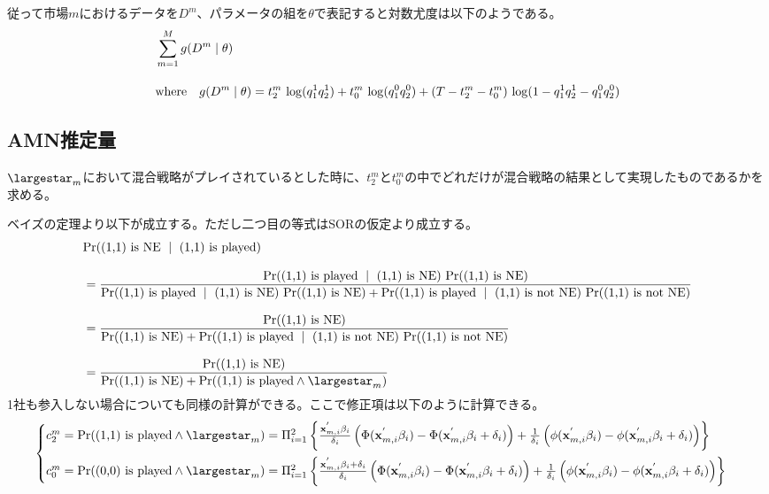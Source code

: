 \documentclass{jsarticle}
\begin{document}
従って市場$m$におけるデータを$D^m$、パラメータの組を$\theta$で表記すると対数尤度は以下のようである。
\begin{align*}
	&\sum_{m = 1}^M g(D^m \mid \theta)\\[10pt]
	&\text{where}\quad g(D^m \mid \theta) = t_2^m\ {\rm log} (q_1^1 q_2^1) + t_0^m\ {\rm log} (q_1^0 q_2^0) + (T - t_2^m - t_0^m)\ {\rm log} (1- q_1^1 q_2^1 - q_1^0 q_2^0)
\end{align*}


\subsection{AMN推定量}
$\largestar_m$において混合戦略がプレイされているとした時に、$t_2^m$と$t_0^m$の中でどれだけが混合戦略の結果として実現したものであるかを求める。

ベイズの定理より以下が成立する。ただし二つ目の等式はSORの仮定より成立する。
\begin{align*}
	&{\rm Pr}(\text{(1,1) is NE}\ \mid\ \text{(1,1) is played}) \\[8pt]
	&= \frac{{\rm Pr}(\text{(1,1) is played}\ \mid\ \text{(1,1) is NE})\ {\rm Pr}(\text{(1,1) is NE})}{{\rm Pr}(\text{(1,1) is played}\ \mid\ \text{(1,1) is NE})\ {\rm Pr}(\text{(1,1) is NE}) + {\rm Pr}(\text{(1,1) is played}\ \mid\ \text{(1,1) is not NE})\ {\rm Pr}(\text{(1,1) is not NE})}\\[8pt]
	&= \frac{{\rm Pr}(\text{(1,1) is NE})}{{\rm Pr}(\text{(1,1) is NE}) + {\rm Pr}(\text{(1,1) is played}\ \mid\ \text{(1,1) is not NE})\ {\rm Pr}(\text{(1,1) is not NE})}\\[8pt]
	&= \frac{{\rm Pr}(\text{(1,1) is NE})}{{\rm Pr}(\text{(1,1) is NE}) + {\rm Pr}(\text{(1,1) is played} \wedge \largestar_m)}
\end{align*}
1社も参入しない場合についても同様の計算ができる。ここで修正項は以下のように計算できる。
\begin{align*}
\begin{cases}
	c_2^m = {\rm Pr}(\text{(1,1) is played} \wedge \largestar_m) = \Pi_{i = 1}^2 \left\{ \frac{{\bf x}_{m, i}^{'} \beta_i }{\delta_i} \left( \Phi({\bf x}_{m, i}^{'} \beta_i) - \Phi({\bf x}_{m, i}^{'} \beta_i  + \delta_i) \right) + \frac{1}{\delta_i} \left( \phi({\bf x}_{m, i}^{'} \beta_i ) - \phi({\bf x}_{m, i}^{'} \beta_i  + \delta_i) \right) \right\}\\[10pt]
	c_0^m = {\rm Pr}(\text{(0,0) is played} \wedge \largestar_m) = \Pi_{i = 1}^2 \left\{ \frac{{\bf x}_{m, i}^{'} \beta_i +\delta_i}{\delta_i} \left( \Phi({\bf x}_{m, i}^{'} \beta_i) - \Phi({\bf x}_{m, i}^{'} \beta_i  + \delta_i) \right) + \frac{1}{\delta_i} \left( \phi({\bf x}_{m, i}^{'} \beta_i ) - \phi({\bf x}_{m, i}^{'} \beta_i  + \delta_i) \right) \right\}
\end{cases}
\end{align*}
\end{document}
